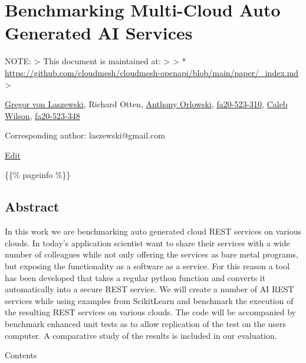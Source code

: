 \hypertarget{benchmarking-multi-cloud-auto-generated-ai-services}{%
\section{Benchmarking Multi-Cloud Auto Generated AI
Services}\label{benchmarking-multi-cloud-auto-generated-ai-services}}


NOTE: \textgreater{} This document is maintained at: \textgreater{}
\textgreater{} *
\url{https://github.com/cloudmesh/cloudmesh-openapi/blob/main/paper/_index.md}
\textgreater{}

\href{https://laszewski.github.io}{Gregor von Laszewski}, Richard Otten,
\href{https://github.com/aporlowski}{Anthony Orlowski},
\href{https://github.com/cybertraining-dsc/fa20-523-310/}{fa20-523-310},
\href{https://github.com/calewils}{Caleb Wilson},
\href{https://github.com/cybertraining-dsc/fa20-523-348/}{fa20-523-348}

Corresponding author: laszewski@gmail.com

\href{https://github.com/cybertraining-dsc/fa20-523-348/blob/main/project/project.md}{Edit}

\{\{\% pageinfo \%\}\}

\hypertarget{abstract}{%
\subsection{Abstract}\label{abstract}}

In this work we are benchmarking auto generated cloud REST services on
various clouds. In today's application scientist want to share their
services with a wide number of colleagues while not only offering the
services as bare metal programs, but exposing the functionality as a
software as a service. For this reason a tool has been developed that
takes a regular python function and converts it automatically into a
secure REST service. We will create a number of AI REST services while
using examples from ScikitLearn and benchmark the execution of the
resulting REST services on various clouds. The code will be accompanied
by benchmark enhanced unit tests as to allow replication of the test on
the users computer. A comparative study of the results is included in
our evaluation.

Contents

